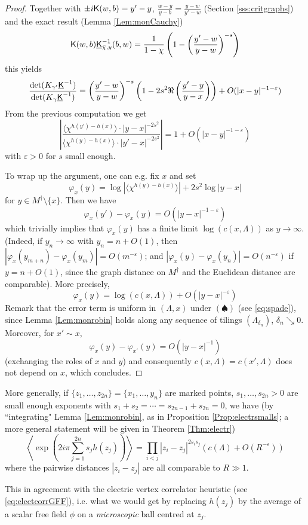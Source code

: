 \documentclass[10pt]{article}
\newcommand{\eps}{\varepsilon}
\newcommand{\rK}{{\sf K}}
\newcommand{\uK}{{\underline {\sf K}}}
\newcommand{\dg}{\dagger}
\begin{document}
\begin{proof}
Together with $\pm i\rK(w,b)=y'-y$, $\frac{w-y}{y-b}=\frac{y-w}{y'-w}$ (Section \ref{sss:critgraphs}) and the exact result (Lemma \ref{Lem:monCauchy})
$$\rK(w,b)\uK^{-1}_{\bar\chi,y}(b,w)=\frac 1{1-\chi}\left(1-\left(\frac{y'-w}{y-w}\right)^{-s}\right)$$
this yields
$$\frac{\det(K_{\gamma'}\uK^{-1})}{\det(K_{\gamma}\uK^{-1})}
=\left(\frac{y'-w}{y-w}\right)^{-s}\left(1-2s^2\Re\left(\frac{y'-y}{y-x}\right)\right)+O(|x-y|^{-1-\eps})$$
From the previous computation we get
$$\left|\frac{\langle\chi^{h(y')-h(x)}\rangle\cdot|y-x|^{-2s^2}}
{\langle\chi^{h(y)-h(x)}\rangle\cdot|y'-x|^{-2s^2}}\right|=1+O(|x-y|^{-1-\eps})$$
with $\eps>0$ for $s$ small enough.

To wrap up the argument, one can e.g. fix $x$ and set
$$\varphi_x(y)=\log|\langle\chi^{h(y)-h(x)}\rangle|+2s^2\log|y-x|$$
for $y\in M^\dg\setminus\{x\}$. Then we have 
$$\varphi_x(y')-\varphi_x(y)=O(|y-x|^{-1-\eps})$$
which trivially implies that $\varphi_x(y)$ has a finite limit $\log(c(x,\Lambda))$ as $y\rightarrow\infty$. (Indeed, if $y_n\rightarrow\infty$ with $y_n=n+O(1)$, then $|\varphi_x(y_{m+n})-\varphi_x(y_m)|=O(m^{-\eps})$; and $|\varphi_x(y)-\varphi_x(y_n)|=O(n^{-\eps})$ if $y=n+O(1)$, since the graph distance on $M^\dg$ and the Euclidean distance are comparable). More precisely,
$$\varphi_x(y)=\log(c(x,\Lambda))+O(|y-x|^{-\eps})$$
Remark that the error term is uniform in $(\Lambda,x)$ under $(\spadesuit)$ (see \eqref{eq:spade}), since Lemma \ref{Lem:monrobin} holds along any sequence of tilings $(\Lambda_{\delta_n})$, $\delta_n\searrow 0$. Moreover, for $x'\sim x$,
$$\varphi_x(y)-\varphi_{x'}(y)=O(|y-x|^{-1})$$
(exchanging the roles of $x$ and $y$) and consequently $c(x,\Lambda)=c(x',\Lambda)$ does not depend on $x$, which concludes.
\end{proof}


More generally, if $\{z_1,\dots,z_{2n}\}=\{x_1,\dots,y_n\}$ are marked points, $s_1,\dots,s_{2n}>0$ are small enough exponents with $s_1+s_2=\cdots=s_{2n-1}+s_{2n}=0$, we have (by ``integrating" Lemma \ref{Lem:monrobin}, as in Proposition \ref{Prop:electrsmalls}; a more general statement will be given in Theorem \ref{Thm:electr})
$$\left\langle\exp(2i\pi\sum_{j=1}^{2n} s_jh(z_j))\right\rangle=\prod_{i<j}|z_i-z_j|^{2s_is_j}(c(\Lambda)+O(R^{-\eps}))$$
where the pairwise distances $|z_i-z_j|$ are all comparable to $R\gg 1$.

This in agreement with the electric vertex correlator heuristic (see \eqref{eq:electcorrGFF}), i.e. what we would get by replacing $h(z_j)$ by the average of a scalar free field $\phi$ on a {\em microscopic} ball centred at $z_j$.  
\end{document}
